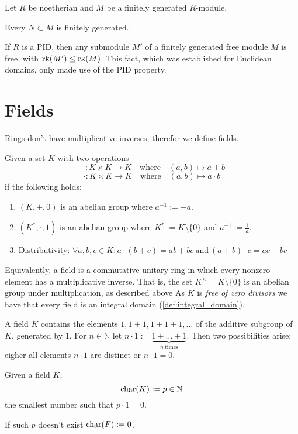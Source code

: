 \begin{proposition}
   Let \(R\) be noetherian and \(M\) be a finitely generated \(R\)-module.

   Every \(N \subset M\) is finitely generated.
\end{proposition}
\begin{remark}
   If \(R\) is a PID, then any submodule \(M'\) of a finitely generated free module \(M\) is free, with \(\operatorname{rk}(M') \leq \operatorname{rk}(M)\).
   This fact, which was established for Euclidean domains, only made use of the PID property.
\end{remark}

\section{Fields}
Rings don't have multiplicative inverses, therefor we define fields.

\begin{definition}[Field]\label{def:field}
   Given a set \(K\) with two operations
   \[+: K \times K \to K \quad\text{where}\quad (a, b) \mapsto a + b\]
   \[\cdot: K \times K \to K \quad\text{where}\quad (a, b) \mapsto a \cdot b\]
   if the following holds:
   \begin{enumerate}[label=\roman*, align=Center]
      \item \((K, +, 0)\) is an abelian group where \(a^{-1} := -a\).
      \item \((K^{*}, \cdot, 1)\) is an abelian group where \(K^{*} := K \setminus \{0\}\) and \(a^{-1} := \frac{1}{a}\).
      \item Distributivity: \(\forall a, b, c \in K: a \cdot (b + c) = ab + bc~\text{and}~(a + b) \cdot c = ac + bc\)
   \end{enumerate}
\end{definition}
\begin{remark}[Intuition]
   Equivalently, a field is a commutative unitary ring in which every nonzero element has a multiplicative inverse.
   That is, the set \(K^{\times} = K \setminus \{0\}\) is an abelian group under multiplication, as described above
   As \(K\) is \emph{free of zero divisors} we have that every field is an integral domain (\ref{def:integral_domain}).
\end{remark}

A field \(K\) contains the elements \(1, 1+1, 1+1+1, \ldots\) of the additive subgroup of \(K\), generated by \(1\).
For \(n \in \mathbb{N}\) let \(n \cdot 1 := \underbrace{1 + \ldots + 1}_{n~\text{times}}\).
Then two possibilities arise: eigher all elements \(n \cdot 1\) are distinct or \(n \cdot 1 = 0\).
\begin{definition}
   Given a field \(K\),
   \[\operatorname{char}(K) := p \in \mathbb{N}\]
   the smallest number such that \(p \cdot 1 = 0\).
\end{definition}
\begin{remark}
   If such \(p\) doesn't exist \(\operatorname{char}(F) := 0\).
\end{remark}

